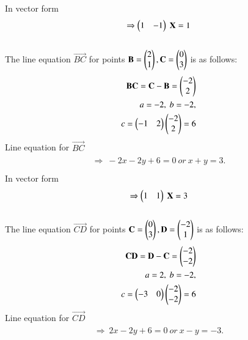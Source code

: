 \documentclass[journal,12pt,twocolumn]{IEEEtran}
\begin{document}
In vector form
\begin{align}
\begin{split}
\Rightarrow \begin{pmatrix}1&-1\end{pmatrix}\ \mathbf{X}=1\\
\end{split}
\end{align}
\\
The line equation $\vec{BC}$ for points $\mathbf{B} = \begin{pmatrix}2\\1\end{pmatrix},\mathbf{C}=\begin{pmatrix}0\\3\end{pmatrix}$ is as follows:
\\
\begin{align}
\begin{split}
\mathbf{BC} = \mathbf{C}-\mathbf{B} = \begin{pmatrix}-2\\2\end{pmatrix}\\
a=-2,\ b=-2,\\
c=\begin{pmatrix}-1 & 2\end{pmatrix} \begin{pmatrix}-2\\2\end{pmatrix}=6\\
\end{split}
\end{align}
Line equation for $\vec{BC}$
\begin{align}
\begin{split}
\Rightarrow\ -2x-2y+6=0 \ or \ x+y=3. \\
\end{split}
\end{align}
In vector form
\begin{align}
\begin{split}
\Rightarrow \begin{pmatrix}1&1\end{pmatrix}\ \mathbf{X}=3
\end{split}
\end{align}
\\
The line equation $\vec{CD}$ for points $\mathbf{C}=\begin{pmatrix}0\\3\end{pmatrix},\mathbf{D} = \begin{pmatrix}-2\\1\end{pmatrix}$ is as follows:
\\
\begin{align}
\begin{split}
\mathbf{CD} = \mathbf{D}-\mathbf{C} =\begin{pmatrix}-2\\-2\end{pmatrix}\\
a=2,\ b=-2,\\
c=\begin{pmatrix}-3 & 0\end{pmatrix} \begin{pmatrix}-2\\-2\end{pmatrix}=6\\
\end{split}
\end{align}
Line equation for $\vec{CD}$
\begin{align}
\begin{split}
 \Rightarrow\ 2x-2y+6=0 \ or \ x-y=-3. \\
\end{split}
\end{align}
\end{document}
